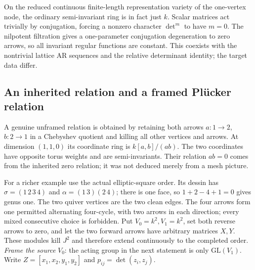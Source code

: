 On the reduced continuous finite-length representation variety of the
one-vertex node, the ordinary semi-invariant ring is in fact just $k$.
Scalar matrices act trivially by conjugation, forcing a nonzero character
$\det^m$ to have $m=0$. The nilpotent filtration gives a one-parameter
conjugation degeneration to zero arrows, so all invariant regular functions
are constant. This coexists with the nontrivial lattice AR sequences and
the relative determinant identity; the target data differ.

\subsection{An inherited relation and a framed Pl\"ucker relation}
A genuine unframed relation is obtained by retaining both arrows
$a:1\to2$, $b:2\to1$ in a Chebyshev quotient and killing all other vertices
and arrows. At dimension $(1,1,0)$ its coordinate ring is
$k[a,b]/(ab)$. The two coordinates have opposite torus weights and are
semi-invariants. Their relation $ab=0$ comes from the inherited zero relation;
it was not deduced merely from a mesh picture.

For a richer example use the actual elliptic-square order. Its dessin has
$\sigma=(1\,2\,3\,4)$ and $\alpha=(1\,3)(2\,4)$; there is one face,
so $1+2-4+1=0$ gives genus one. The two quiver vertices are the two clean
edges. The four arrows form one permitted alternating four-cycle, with two
arrows in each direction; every mixed consecutive choice is forbidden. Put
$V_0=k^2,V_1=k^2$, set both reverse arrows to zero, and let the two forward
arrows have arbitrary matrices $X,Y$. These modules kill $J^2$ and therefore
extend continuously to the completed order. \emph{Frame the source} $V_0$:
the acting group in the next statement is only $\mathrm{GL}(V_1)$.
Write $Z=[x_1,x_2,y_1,y_2]$ and $p_{ij}=\det(z_i,z_j)$.

